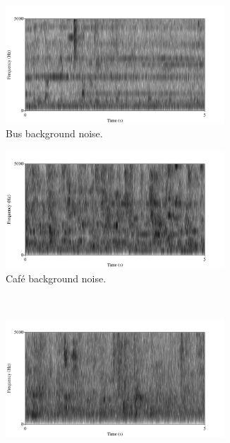 \documentclass[dissertation,copyright]{uathesis}
\begin{document}
\begin{figure}[h!]
\begin{subfigure}{0.475\linewidth}
  \centering
  \includegraphics[width=0.9\textwidth]{figure/spctgrm-bus-background.png}
  \caption{Bus background noise.}
  \label{fig:bus-bkgrnd}
\end{subfigure}
\qquad
\begin{subfigure}{0.475\linewidth}
  \centering
  \includegraphics[width=0.9\textwidth]{figure/spctgrm-cafe-background.png}
  \caption{Caf\'{e} background noise.}
  \label{fig:cafe-bkgrnd}
\end{subfigure}%
\\[2ex]
\begin{subfigure}{0.475\linewidth}
  \centering
  \includegraphics[width=0.9\textwidth]{figure/spctgrm-ped-background.png}

\end{subfigure}
\end{figure}
\end{document}
